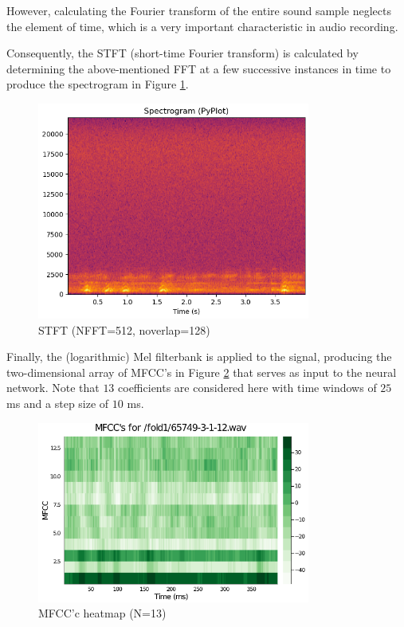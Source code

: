 \documentclass[a4paper,12pt]{article}
\numberwithin{equation}{section}
\numberwithin{figure}{section}
\numberwithin{table}{section}
\begin{document}
However, calculating the Fourier transform of the entire sound sample neglects the element of time, which is a very important characteristic in audio recording.

Consequently, the STFT (short-time Fourier transform) is calculated by determining the above-mentioned FFT at a few successive instances in time to produce the spectrogram in Figure \ref{stft_example}.

\begin{figure}[h!]
    \centering %
    \includegraphics[padding=1ex,width=0.8\textwidth,frame]{img/stft_example.png}
    \caption{STFT (NFFT=512, noverlap=128)}
    \label{stft_example}
\end{figure}

Finally, the (logarithmic) Mel filterbank is applied to the signal, producing the two-dimensional array of MFCC's in Figure \ref{mfcc_example} that serves as input to the neural network. Note that $13$ coefficients are considered here with time windows of $25$ ms and a step size of $10$ ms. %

\begin{figure}[h!]
    \centering %
    \includegraphics[padding=1ex,width=0.8\textwidth,frame]{img/mfcc_example.png}
    \caption{MFCC'c heatmap (N=13)}
    \label{mfcc_example}
\end{figure}
\end{document}
